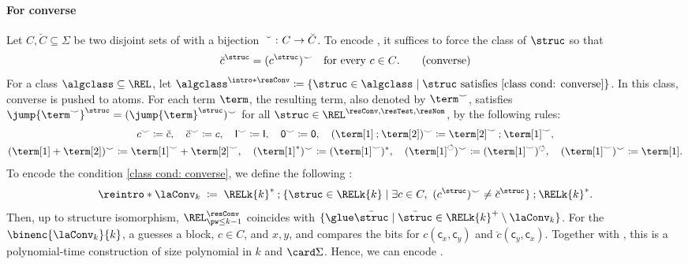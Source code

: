 \documentclass[10pt,a4paper]{article}
\theoremstyle{definition}
\theoremstyle{remark}
\DeclarePairedDelimiter\set{\{}{\}}
\newcommand{\const}[1]{\mathsf{#1}}
\newcommand{\defeq}{\coloneq}
\newcommand{\mul}[1]{\bar{#1}}
\newcommand{\union}{\mathbin{+}}
\newcommand{\id}{\const{I}}
\newcommand{\emp}{\const{0}}
\newcommand{\compo}{\mathbin{;}}
\newcommand{\lop}{\circlearrowleft}
\newcommand{\vsig}{\Sigma}
\begin{document}
\paragraph*{For converse}
Let $C, \breve{C} \subseteq \vsig$ be two disjoint sets of  with a bijection $\breve{\mbox{\quad}} \colon C \to \breve{C}$.
To encode \intro*{}, it suffices to force the class of  $\struc$
so that
\begin{align*}
\breve{c}^{\struc} = (c^{\struc})^{\smile} \text{\quad for every $c \in C$.} \tag{converse}\label{class cond: converse}
\end{align*}
\AP
For a class $\algclass \subseteq \REL$,
let $\algclass^{\intro*\resConv} \defeq \set{\struc \in \algclass \mid \text{$\struc$ satisfies \eqref{class cond: converse}}}$.
In this class, converse is pushed to atoms.
For each term $\term$, the resulting term, also denoted by $\term^{\smile}$, satisfies
$\jump{\term^{\smile}}^{\struc} = (\jump{\term}^{\struc})^{\smile}$ for all
$\struc \in \REL^{\resConv,\resTest,\resNom}$, by the following rules:
\begin{gather*}
    c^{\smile} \defeq \breve{c}, \quad
    \breve{c}^{\smile} \defeq c, \quad
    \id^{\smile} \defeq \id, \quad
    \emp^{\smile} \defeq \emp, \quad
    (\term[1] \compo \term[2])^{\smile} \defeq \term[2]^{\smile} \compo \term[1]^{\smile}, \\
    (\term[1] \union \term[2])^{\smile} \defeq \term[1]^{\smile} \union \term[2]^{\smile}, \quad
    (\term[1]^{*})^{\smile} \defeq (\term[1]^{\smile})^{*}, \quad
    (\term[1]^{\lop})^{\smile} \defeq (\term[1]^{\smile})^{\lop}, \quad
    (\term[1]^{\smile})^{\smile} \defeq \term[1].
\end{gather*}
To encode the condition \eqref{class cond: converse}, we define the following :
\AP
{}
\[\reintro*\laConv_{k} \;\defeq\;
\RELk{k}^{*} \compo
\set{\struc \in \RELk{k} \mid \exists c \in C,\ (c^{\struc})^{\smile} \neq \breve{c}^{\struc} } \compo 
\RELk{k}^{*}.\]
Then, up to structure isomorphism,
$\REL^{\resConv}_{\pw \le k-1}$ coincides with
$\set{\glue \mul{\struc} \mid \mul{\struc} \in \RELk{k}^{+} \setminus \laConv_{k}}$.
For the  $\binenc{\laConv_{k}}{k}$,
a  guesses a block, $c\in C$, and $x,y$, and compares the bits for
$c(\const{c}_x,\const{c}_y)$ and $\breve c(\const{c}_y,\const{c}_x)$.
Together with , this is a polynomial-time construction
of size polynomial in $k$ and $\card\vsig$.
Hence, we can encode .
\end{document}
